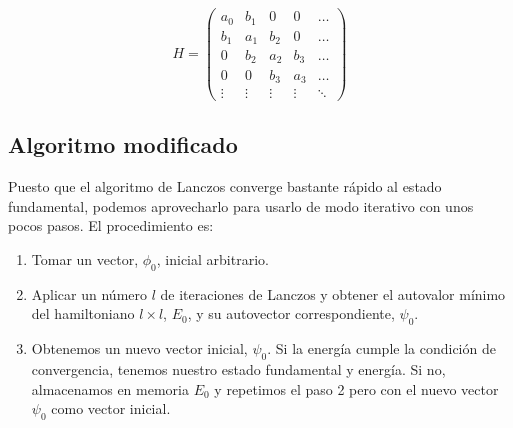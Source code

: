\documentclass{beamer}
\begin{document}
\begin{frame}
    \begin{equation}
        H = \left(\begin{array}{ccccc}
            a_0 & b_1 & 0 & 0 & \ldots \\
            b_1 & a_1 & b_2 & 0 & \ldots \\
            0 & b_2 & a_2 & b_3 & \ldots \\
            0 & 0 & b_3 & a_3 & \ldots \\
            \vdots & \vdots & \vdots & \vdots & \ddots
        \end{array}\right)
    \end{equation}
    \subsection{Algoritmo modificado}
    Puesto que el algoritmo de Lanczos converge bastante rápido al estado fundamental, podemos aprovecharlo para usarlo de modo iterativo con unos pocos pasos. El procedimiento es:
    \begin{enumerate}
        \item Tomar un vector, $\phi_0$, inicial arbitrario.
        \item Aplicar un número $l$ de iteraciones de Lanczos y obtener el autovalor mínimo del hamiltoniano $l \times l$, $E_0$, y su autovector correspondiente, $\psi_0$.
        \item Obtenemos un nuevo vector inicial, $\psi_0$. Si la energía cumple la condición de convergencia, tenemos nuestro estado fundamental y energía. Si no, almacenamos en memoria $E_0$ y repetimos el paso 2 pero con el nuevo vector $\psi_0$ como vector inicial.
    \end{enumerate}
\end{frame}
\end{document}
